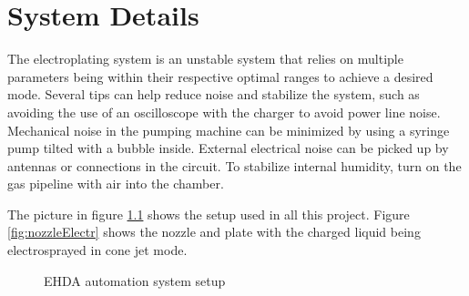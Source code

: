 \chapter{System Details}


The electroplating system is an unstable system that relies on multiple parameters being within their respective optimal ranges to achieve a desired mode. 
Several tips can help reduce noise and stabilize the system, such as avoiding the use of an oscilloscope with the charger to avoid power line noise. 
Mechanical noise in the pumping machine can be minimized by using a syringe pump tilted with a bubble inside. 
External electrical noise can be picked up by antennas or connections in the circuit. 
To stabilize internal humidity, turn on the gas pipeline with air into the chamber.

The picture in figure \ref{fig:setup_pic} shows the setup used in all this project. Figure \ref{fig:nozzleElectr} shows the nozzle and plate with the charged liquid being electrosprayed in cone jet mode.

\begin{figure}[H]
  \centering
  \caption{EHDA automation system setup}
  \label{fig:setup_pic}
\end{figure}

